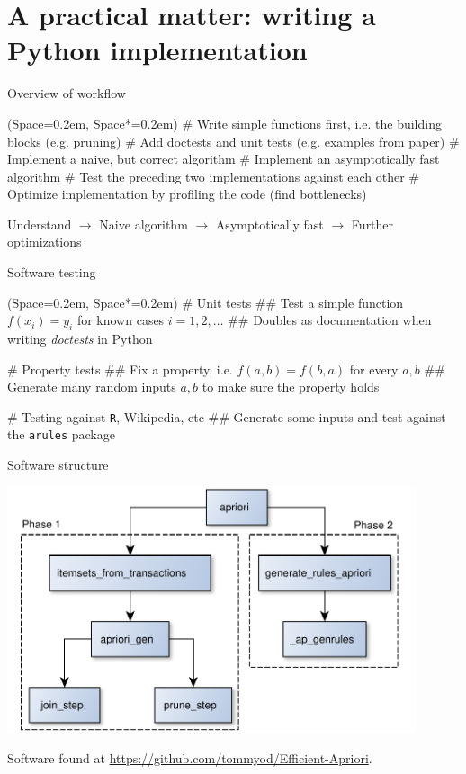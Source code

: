 \documentclass[12pt, aspectratio=1610]{beamer}
\newcommand{\listSpace}{0.2em}
\theoremstyle{plain}
\begin{document}
\section{A practical matter: writing a Python implementation}
\begin{frame}[fragile]{Overview of workflow}
	\begin{easylist}[itemize]
		\ListProperties(Space=\listSpace, Space*=\listSpace)
		# Write simple functions first, i.e. the building blocks (e.g. pruning)
		# Add doctests and unit tests (e.g. examples from paper)
		# Implement a naive, but correct algorithm
		# Implement an asymptotically fast algorithm
		# Test the preceding two implementations against each other
		# Optimize implementation by profiling the code (find bottlenecks)
	\end{easylist}
	\vfill
	Understand $\to$ Naive algorithm $\to$ Asymptotically fast $\to$ Further optimizations
\end{frame}

\begin{frame}[fragile]{Software testing}
	\begin{easylist}[itemize]
		\ListProperties(Space=\listSpace, Space*=\listSpace)
		# Unit tests
		## Test a simple function $f(x_i) = y_i$ for known cases $i=1,2,\dots$
		## Doubles as documentation when writing \emph{doctests} in Python
		
		# Property tests
		## Fix a property, i.e. $f(a, b) = f(b, a)$ for every $a,b$
		## Generate many random inputs $a,b$ to make sure the property holds
		
		# Testing against \verb|R|, Wikipedia, etc
		## Generate some inputs and test against the \verb|arules| package
	\end{easylist}
\end{frame}

\begin{frame}[fragile]{Software structure}
	\begin{center}
		\includegraphics[width=12cm]{figs/apriori_software_functions.pdf}
	\end{center}
	{\footnotesize Software found at \url{https://github.com/tommyod/Efficient-Apriori}.}
\end{frame}
\end{document}
